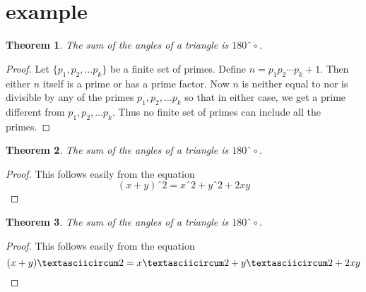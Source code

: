 \documentclass{article}
\theoremstyle{plain}
\newtheorem{mythm}{Theorem}[section]
\begin{document}
\section{example}

\begin{mythm}
The sum of the angles of a triangle is $180ˆ\circ$.
\end{mythm}
\begin{proof}
Let $\{p_1,p_2,\dotsc p_k\}$ be a finite set of primes. Define $n=p_1p_2\dotsm
p_k+1$. Then either $n$ itself is a prime or has a prime factor. Now $n$ is
neither equal to nor is divisible by any of the primes $p_1,p_2,\dotsc p_k$ so
that in either case, we get a prime different from $p_1,p_2,\dotsc p_k$. Thus
no finite set of primes can include all the primes.
\end{proof}


\begin{mythm}
The sum of the angles of a triangle is $180ˆ\circ$.
\end{mythm}
\begin{proof}
This follows easily from the equation
\begin{equation}
(x+y)ˆ2=xˆ2+yˆ2+2xy\tag*{\qed}
\end{equation}
\renewcommand{\qed}{}
\end{proof}

\begin{mythm}
The sum of the angles of a triangle is $180ˆ\circ$.
\end{mythm}
\begin{proof}
This follows easily from the equation
\begin{equation*}
(x+y)ˆ2=xˆ2+yˆ2+2xy\qed
\end{equation*}
\renewcommand{\qed}{}
\end{proof}
\end{document}
